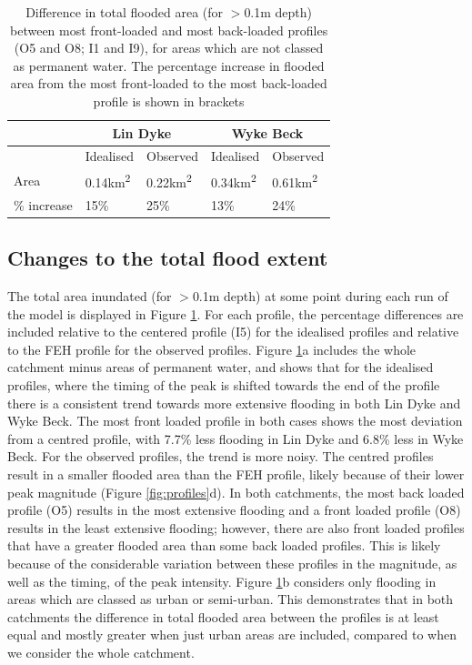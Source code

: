 \documentclass[APA,Times2COL]{WileyNJDv5}
\begin{document}
\begingroup
\renewcommand{\arraystretch}{1.3} %
\begin{table}[h!]
\caption{Difference in total flooded area (for $>$0.1m depth) between most front-loaded and most back-loaded profiles (O5 and O8; I1 and I9), for areas which are not classed as permanent water. The percentage increase in flooded area from the most front-loaded to the most back-loaded profile is shown in brackets} \label{fig:total_flooded_area} 
\begin{tabular}{lllll}
\hline
 & \multicolumn{2}{c}{\textbf{Lin Dyke}}  & \multicolumn{2}{c}{\textbf{Wyke Beck }} \\
 \hline
 & Idealised     & Observed      & Idealised     & Observed      \\
\hline
Area & 0.14km\textsuperscript{2} & 0.22km\textsuperscript{2}  & 0.34km\textsuperscript{2}  & 0.61km\textsuperscript{2} \\
\% increase & 15\% & 25\%  & 13\%  & 24\% \\
\hline
\end{tabular}
\end{table}
\endgroup


\subsection{Changes to the total flood extent}\label{subsec:model}

The total area inundated (for $>$0.1m depth) at some point during each run of the model is displayed in Figure \ref{fig:total_flooded_area}. For each profile, the percentage differences are included relative to the centered profile (I5) for the idealised profiles and relative to the FEH profile for the observed profiles. Figure \ref{fig:total_flooded_area}a includes the whole catchment minus areas of permanent water, and shows that for the idealised profiles, where the timing of the peak is shifted towards the end of the profile there is a consistent trend towards more extensive flooding in both Lin Dyke and Wyke Beck. The most front loaded profile in both cases shows the most deviation from a centred profile, with 7.7\% less flooding in Lin Dyke and 6.8\% less in Wyke Beck. For the observed profiles, the trend is more noisy. The centred profiles result in a smaller flooded area than the FEH profile, likely because of their lower peak magnitude (Figure \ref{fig:profiles}d). In both catchments, the most back loaded profile (O5) results in the most extensive flooding and a front loaded profile (O8) results in the least extensive flooding; however, there are also front loaded profiles that have a greater flooded area than some back loaded profiles. This is likely because of the considerable variation between these profiles in the magnitude, as well as the timing, of the peak intensity. Figure \ref{fig:total_flooded_area}b considers only flooding in areas which are classed as urban or semi-urban. This demonstrates that in both catchments the difference in total flooded area between the profiles is at least equal and mostly greater when just urban areas are included, compared to when we consider the whole catchment. 
\end{document}
